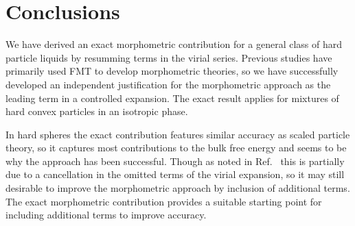 \documentclass[11pt,twoside]{report}
\begin{document}
\section{Conclusions}

We have derived an exact morphometric contribution for a general class of hard particle liquids by resumming terms in the virial series.
Previous studies have primarily used FMT to develop morphometric theories, so we have successfully developed an independent justification for the morphometric approach as the leading term in a controlled expansion.
The exact result applies for mixtures of hard convex particles in an isotropic phase.


In hard spheres the exact contribution features similar accuracy as scaled particle theory, so it captures most contributions to the bulk free energy and seems to be why the approach has been successful.
Though as noted in Ref.\ \cite{MarechalPRE2014} this is partially due to a cancellation in the omitted terms of the virial expansion, so it may still desirable to improve the morphometric approach by inclusion of additional terms.
The exact morphometric contribution provides a suitable starting point for including additional terms to improve accuracy.

\end{document}
